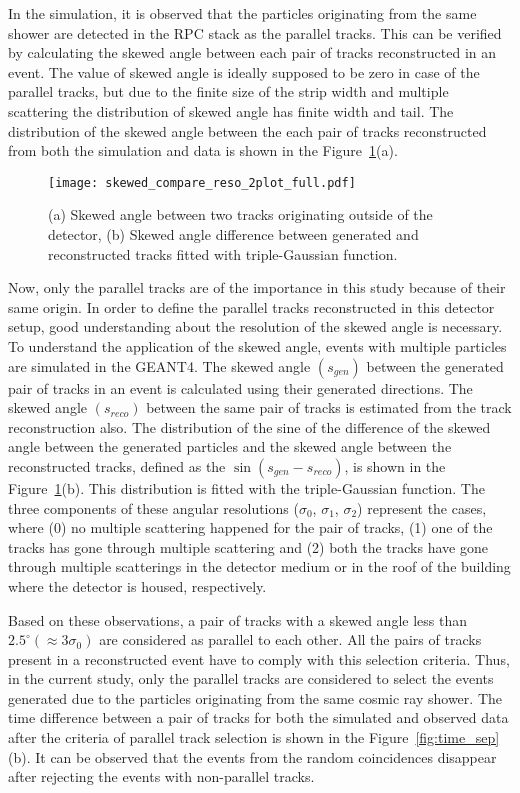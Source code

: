 In the simulation, it is observed that the particles originating
from the same shower are detected in the RPC stack as the parallel
tracks. This can be verified by calculating the skewed angle between
each pair of tracks reconstructed in an event. The value of
skewed angle is ideally supposed to be zero in case of the parallel
tracks, but due to the finite size of the strip width and multiple
scattering the distribution of skewed angle has finite width and tail.
The distribution of the
skewed angle between the each pair of tracks reconstructed from
both the simulation and data is shown in the
Figure~\ref{fig:skewed_angle}(a).
\begin{figure}[h]
  \texttt{[image: skewed\_compare\_reso\_2plot\_full.pdf]}
  \caption{(a) Skewed angle between two tracks originating
    outside of the detector, (b) Skewed angle difference
    between generated and reconstructed tracks fitted with
    triple-Gaussian function.}
  \label{fig:skewed_angle}
\end{figure}
Now, only the parallel tracks are of the importance in this study
because of their same origin. In order to define the parallel tracks
reconstructed in this detector setup, good understanding about the
resolution of the skewed angle is necessary. To understand the
application of the skewed angle, events with multiple particles are
simulated in the GEANT4. The skewed angle $\left(s_{gen}\right)$
between the generated pair of tracks in an event is calculated using
their generated directions. The skewed angle $\left(s_{reco}\right)$
between the same pair of tracks is estimated from the track
reconstruction also. The distribution of the sine of the difference
of the skewed angle between the generated particles and the skewed
angle between the reconstructed tracks, defined as the
$\sin\left(s_{gen}-s_{reco}\right)$, is shown in the
Figure~\ref{fig:skewed_angle}(b). This distribution is fitted with
the triple-Gaussian function. The three components of these angular
resolutions ($\sigma_{0}$, $\sigma_{1}$, $\sigma_{2}$) represent the
cases, where (0) no multiple scattering happened for the pair of
tracks, (1) one of the tracks has gone through multiple scattering and
(2) both the tracks have gone through multiple scatterings in the
detector medium or in the roof of the building where the detector is
housed, respectively.

Based on these observations, a pair of tracks with a skewed angle less
than $2.5^{\circ} \left(\approx 3\sigma_{0}\right)$ are considered as
parallel to each other. All the pairs of tracks present in a
reconstructed event have to comply with this selection criteria.
Thus, in the current study, only the parallel tracks are considered
to select the events generated due to the particles originating from
the same cosmic ray shower. The time difference between a pair of
tracks for both the simulated and observed data after the criteria of
parallel track selection is shown in the Figure~\ref{fig:time_sep}(b).
It can be observed that the events from the random coincidences
disappear after rejecting the events with non-parallel tracks.


